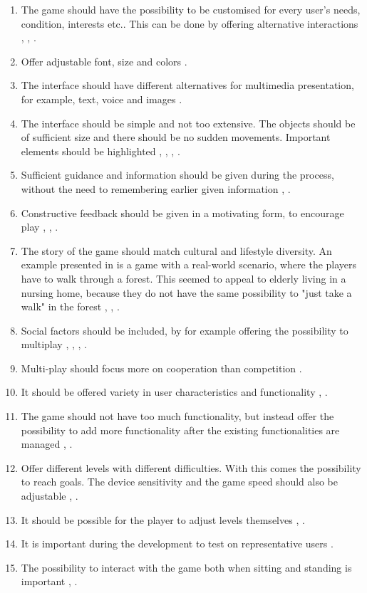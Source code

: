 \begin{enumerate}[{g}.1]
\renewcommand{\labelitemi}{$\bullet$}
\item The game should have the possibility to be customised for every user's needs, condition, interests etc.. This can be done by offering alternative interactions \cite{Billis}, \cite{gregor}, \cite{gerling1}.
\item Offer adjustable font, size and colors \cite{Billis}.
\item The interface should have different alternatives for multimedia presentation, for example, text, voice and images \cite{Billis}.
\item The interface should be simple and not too extensive. The objects should be of sufficient size and there should be no sudden movements. Important elements should be highlighted \cite{Billis}, \cite{gerling1}, \cite{gerling2}, \cite{exergamesforelderly}.
\item Sufficient guidance and information should be given during the process, without the need to remembering earlier given information \cite{Billis}, \cite{gregor}.
\item Constructive feedback should be given in a motivating form, to encourage play \cite{Billis}, \cite{gerling1}, \cite{exergamesforelderly}.
\item The story of the game should match cultural and lifestyle diversity. An example presented in \cite{gerling2} is a game with a real-world scenario, where the players have to walk through a forest. This seemed to appeal to elderly living in a nursing home, because they do not have the same possibility to "just take a walk" in the forest \cite{Billis}, \cite{gregor}, \cite{gerling2}. 
\item Social factors should be included, by for example offering the possibility to multiplay \cite{Billis}, \cite{gerling2}, \cite{gerling1}, \cite{exergamesforelderly}.
\item Multi-play should focus more on cooperation than competition \cite{Gajadhar}.
\item It should be offered variety in user characteristics and functionality \cite{gregor}, \cite{gerling1}.
\item The game should not have too much functionality, but instead offer the possibility to add more functionality after the existing functionalities are managed \cite{gregor}, \cite{gerling2}.
\item Offer different levels with different difficulties. With this comes the possibility to reach goals. The device sensitivity and the game speed should also be adjustable \cite{gregor}, \cite{gerling1}.
\item It should be possible for the player to adjust levels themselves \cite{gregor}, \cite{gerling1}. 
\item It is important during the development to test on representative users \cite{gregor}.
\item The possibility to interact with the game both when sitting and standing is important \cite{gerling1}, \cite{gerling2}.
\end{enumerate}

